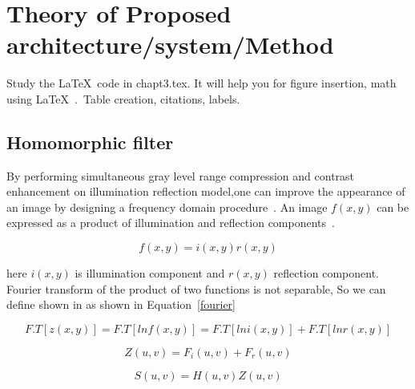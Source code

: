 \chapter{Theory of Proposed architecture/system/Method}

Study the \LaTeX\ code in chapt3.tex.
It will help you for figure insertion, math using \LaTeX\ .\, Table creation,
citations, labels.
\section{Homomorphic filter} 
By performing simultaneous gray level range compression and contrast enhancement on illumination reflection model,one can improve the appearance of an image by designing a frequency domain procedure~\cite{man87}.
An image $f(x,y)$ can be expressed as a product of illumination and reflection components~\cite{sam09}.


\begin{equation}
f(x,y)=i(x,y)r(x,y)
\end{equation}


here $ i(x,y) $ is  illumination component and  $ r(x,y) $ reflection component.\\



Fourier transform of the product of two functions is not separable, So we can define shown in as shown in Equation~\ref{fourier}

\begin{equation}
F.T[z(x,y)]=F.T[ln f(x,y)]=F.T[ln i(x,y)]+F.T[ln r(x,y)]
\label{fourier}
\end{equation}

\begin{equation}
Z(u,v)=F_{i}(u,v)+F_{r}(u,v)
\end{equation}


 \begin{equation}
  S(u,v)=H(u,v)Z(u,v)
 \end{equation}

